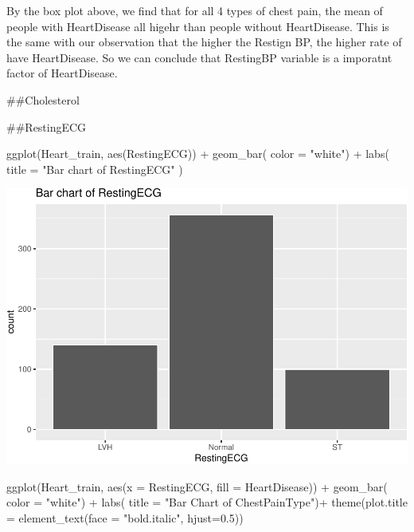 \documentclass[
]{article}
\newenvironment{Shaded}{\begin{snugshade}}{\end{snugshade}}
\newcommand{\AttributeTok}[1]{\textcolor[rgb]{0.77,0.63,0.00}{#1}}
\newcommand{\FloatTok}[1]{\textcolor[rgb]{0.00,0.00,0.81}{#1}}
\newcommand{\FunctionTok}[1]{\textcolor[rgb]{0.00,0.00,0.00}{#1}}
\newcommand{\NormalTok}[1]{#1}
\newcommand{\SpecialCharTok}[1]{\textcolor[rgb]{0.00,0.00,0.00}{#1}}
\newcommand{\StringTok}[1]{\textcolor[rgb]{0.31,0.60,0.02}{#1}}
\begin{document}
By the box plot above, we find that for all 4 types of chest pain, the
mean of people with HeartDisease all higehr than people without
HeartDisease. This is the same with our observation that the higher the
Restign BP, the higher rate of have HeartDisease. So we can conclude
that RestingBP variable is a imporatnt factor of HeartDisease.

\#\#Cholesterol

\#\#RestingECG

\begin{Shaded}
\begin{Highlighting}[]
\FunctionTok{ggplot}\NormalTok{(Heart\_train, }\FunctionTok{aes}\NormalTok{(RestingECG)) }\SpecialCharTok{+}
  \FunctionTok{geom\_bar}\NormalTok{( }\AttributeTok{color =} \StringTok{"white"}\NormalTok{) }\SpecialCharTok{+}
  \FunctionTok{labs}\NormalTok{(}
    \AttributeTok{title =} \StringTok{"Bar chart of RestingECG"}
\NormalTok{  )}
\end{Highlighting}
\end{Shaded}

\includegraphics{PSTAT-131--FINAL-PROJECT-_YIFAN-XU_files/figure-latex/unnamed-chunk-12-1.pdf}

\begin{Shaded}
\begin{Highlighting}[]
\FunctionTok{ggplot}\NormalTok{(Heart\_train, }\FunctionTok{aes}\NormalTok{(}\AttributeTok{x =}\NormalTok{ RestingECG, }\AttributeTok{fill =}\NormalTok{ HeartDisease)) }\SpecialCharTok{+}
  \FunctionTok{geom\_bar}\NormalTok{( }\AttributeTok{color =} \StringTok{"white"}\NormalTok{) }\SpecialCharTok{+}
  \FunctionTok{labs}\NormalTok{(}
    \AttributeTok{title =} \StringTok{"Bar Chart of ChestPainType"}\NormalTok{)}\SpecialCharTok{+}
  \FunctionTok{theme}\NormalTok{(}\AttributeTok{plot.title =} \FunctionTok{element\_text}\NormalTok{(}\AttributeTok{face =} \StringTok{"bold.italic"}\NormalTok{, }\AttributeTok{hjust=}\FloatTok{0.5}\NormalTok{))}
\end{Highlighting}
\end{Shaded}
\end{document}

